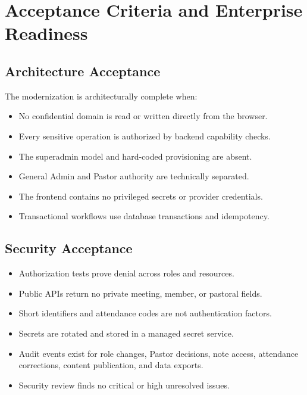 \documentclass[11pt,a4paper,oneside]{report}
\begin{document}
\chapter{Acceptance Criteria and Enterprise Readiness}

\section{Architecture Acceptance}

The modernization is architecturally complete when:

\begin{itemize}
  \item No confidential domain is read or written directly from the browser.
  \item Every sensitive operation is authorized by backend capability checks.
  \item The superadmin model and hard-coded provisioning are absent.
  \item General Admin and Pastor authority are technically separated.
  \item The frontend contains no privileged secrets or provider credentials.
  \item Transactional workflows use database transactions and idempotency.
\end{itemize}

\section{Security Acceptance}

\begin{itemize}
  \item Authorization tests prove denial across roles and resources.
  \item Public APIs return no private meeting, member, or pastoral fields.
  \item Short identifiers and attendance codes are not authentication factors.
  \item Secrets are rotated and stored in a managed secret service.
  \item Audit events exist for role changes, Pastor decisions, note access, attendance corrections, content publication, and data exports.
  \item Security review finds no critical or high unresolved issues.
\end{itemize}
\end{document}
